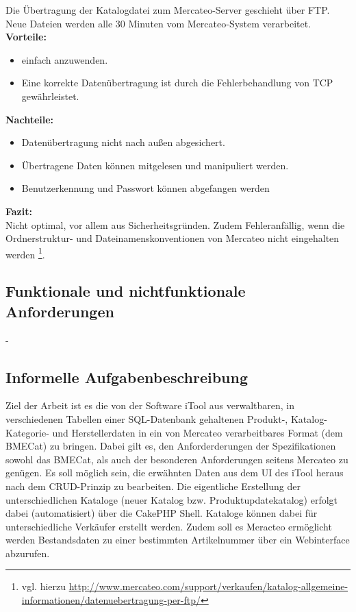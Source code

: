 	Die Übertragung der Katalogdatei zum Mercateo-Server geschieht über FTP. Neue Dateien werden alle 30 Minuten vom Mercateo-System verarbeitet.\\
	\textbf{Vorteile:}
 	\begin{itemize}
   	\item einfach anzuwenden.
   	\item Eine korrekte Datenübertragung ist durch die Fehlerbehandlung von TCP gewährleistet.
   	\end{itemize}
	\textbf{Nachteile:}
   	\begin{itemize}
   	\item Datenübertragung nicht nach außen abgesichert.
   	\item Übertragene Daten können mitgelesen und manipuliert werden.
   	\item Benutzerkennung und Passwort können abgefangen werden
   	\end{itemize}
   	\textbf{Fazit:}\\
	Nicht optimal, vor allem aus Sicherheitsgründen. Zudem Fehleranfällig, wenn die Ordnerstruktur- und Dateinamenskonventionen von Mercateo nicht eingehalten werden \footnote{vgl. hierzu \url{http://www.mercateo.com/support/verkaufen/katalog-allgemeine-informationen/datenuebertragung-per-ftp/}}.

		
		
	\subsection{Funktionale und nichtfunktionale Anforderungen}	
			- 
	
	\subsection{Informelle Aufgabenbeschreibung}
	Ziel der Arbeit ist es die von der Software iTool aus verwaltbaren, in verschiedenen Tabellen einer SQL-Datenbank gehaltenen Produkt-, Katalog- Kategorie- und Herstellerdaten in ein von Mercateo verarbeitbares Format (dem BMECat) zu bringen. Dabei gilt es, den Anforderderungen der Spezifikationen sowohl das BMECat, als auch der besonderen Anforderungen seitens Mercateo zu genügen.
	Es soll möglich sein, die erwähnten Daten aus dem UI des iTool heraus nach dem CRUD-Prinzip zu bearbeiten. 
	Die eigentliche Erstellung der unterschiedlichen Kataloge (neuer Katalog bzw. Produktupdatekatalog) erfolgt dabei (automatisiert) über die CakePHP Shell. Kataloge können dabei für unterschiedliche Verkäufer erstellt werden.
	Zudem soll es Meracteo ermöglicht werden Bestandsdaten zu einer bestimmten Artikelnummer über ein Webinterface abzurufen.
	
